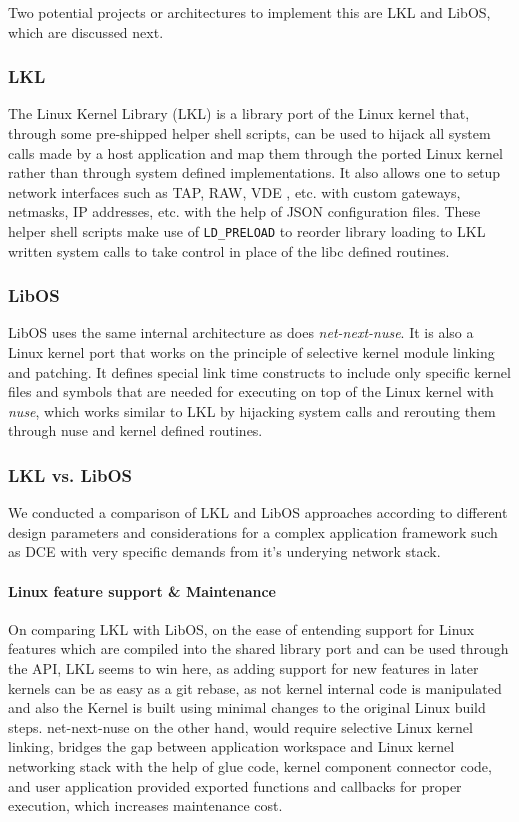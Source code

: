 \documentclass{sig-alternate}
\begin{document}
Two potential projects or architectures to implement this are LKL and LibOS, which are discussed next.

\subsubsection{LKL}
The Linux Kernel Library (LKL) is a library port of the Linux kernel that, through some pre-shipped helper shell scripts, can be used to hijack
all system calls made by a host application and map them through the ported Linux kernel rather than through system defined implementations. It also allows one 
to setup network interfaces such as TAP, RAW, VDE , etc. with custom gateways, netmasks, IP addresses, etc. with the help of JSON configuration files. These helper
shell scripts make use of \texttt{LD\_PRELOAD} to reorder library loading to LKL written system calls to take control in place of the libc defined routines.
 
\subsubsection{LibOS}
LibOS uses the same internal architecture as does \textit{net-next-nuse}.
It is also a Linux kernel port that works on the principle of selective 
kernel module linking and patching. It defines special link time constructs
to include only specific kernel files and 
symbols that are needed for executing on top of the Linux kernel with \textit{nuse}, which works similar to LKL by hijacking system calls 
and rerouting them through nuse and kernel defined routines.

\subsubsection{LKL vs. LibOS}
We conducted a comparison of LKL and LibOS approaches according to different design parameters and considerations for a complex application framework such as
DCE with very specific demands from it's underying network stack.

\paragraph{Linux feature support \& Maintenance}
On comparing LKL with LibOS, on the ease of entending support for Linux features which are compiled into the shared library port and 
can be used through the API, LKL seems to win here, as adding support for new features in later kernels can be as easy as a git rebase, as not kernel internal code  
is manipulated and also the Kernel is built using minimal changes to the original Linux build steps. net-next-nuse on the other hand, would require selective Linux 
kernel linking, bridges the gap between application workspace and Linux kernel networking stack with the help of glue code, kernel component connector code, and user 
application provided exported functions and callbacks for proper execution, which increases maintenance cost.
\end{document}
